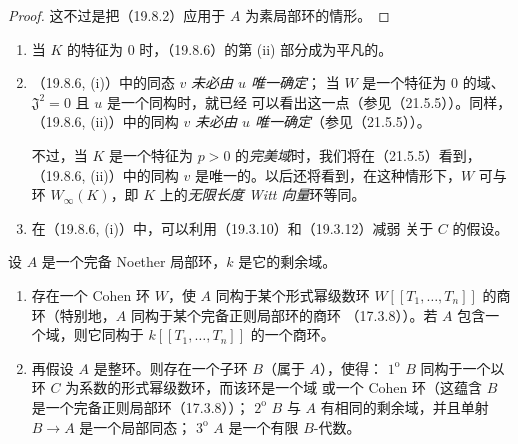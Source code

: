 \begin{proof}
这不过是把（19.8.2）应用于 $A$ 为素局部环的情形。
\end{proof}

\begin{remarks}[19.8.7]
\label{0.19.8.7-fr}
\begin{enumerate}
  \item[(i)] 当 $K$ 的特征为 $0$ 时，（19.8.6）的第 (ii) 部分成为平凡的。
  \item[(ii)] （19.8.6, (i)）中的同态 $v$ \emph{未必由 $u$ 唯一确定}；
  当 $W$ 是一个特征为 $0$ 的域、$\mathfrak J^2=0$ 且 $u$ 是一个同构时，就已经
  可以看出这一点（参见（21.5.5））。同样，（19.8.6, (ii)）中的同构 $v$
  \emph{未必由 $u$ 唯一确定}（参见（21.5.5））。

  不过，当 $K$ 是一个特征为 $p>0$ 的\emph{完美域}时，我们将在（21.5.5）看到，
  （19.8.6, (ii)）中的同构 $v$ 是唯一的。以后还将看到，在这种情形下，$W$ 可与
  环 $W_\infty(K)$，即 $K$ 上的\emph{无限长度 Witt 向量}环等同。
  \item[(iii)] 在（19.8.6, (i)）中，可以利用（19.3.10）和（19.3.12）减弱
  关于 $C$ 的假设。
\end{enumerate}
\end{remarks}

\begin{theorem}[19.8.8]
\label{0.19.8.8-fr}
设 $A$ 是一个完备 Noether 局部环，$k$ 是它的剩余域。


\begin{enumerate}
  \item[(i)] 存在一个 Cohen 环 $W$，使 $A$ 同构于某个形式幂级数环
  $W[[T_1,\ldots,T_n]]$ 的商环（特别地，$A$ 同构于某个完备正则局部环的商环
  （17.3.8））。若 $A$ 包含一个域，则它同构于
  $k[[T_1,\ldots,T_n]]$ 的一个商环。
  \item[(ii)] 再假设 $A$ 是整环。则存在一个子环 $B$（属于 $A$），使得：
  $1^{\mathrm o}$ $B$ 同构于一个以环 $C$ 为系数的形式幂级数环，而该环是一个域
  或一个 Cohen 环（这蕴含 $B$ 是一个完备正则局部环（17.3.8））；
  $2^{\mathrm o}$ $B$ 与 $A$ 有相同的剩余域，并且单射 $B\to A$ 是一个局部同态；
  $3^{\mathrm o}$ $A$ 是一个有限 $B$-代数。
\end{enumerate}
\end{theorem}

